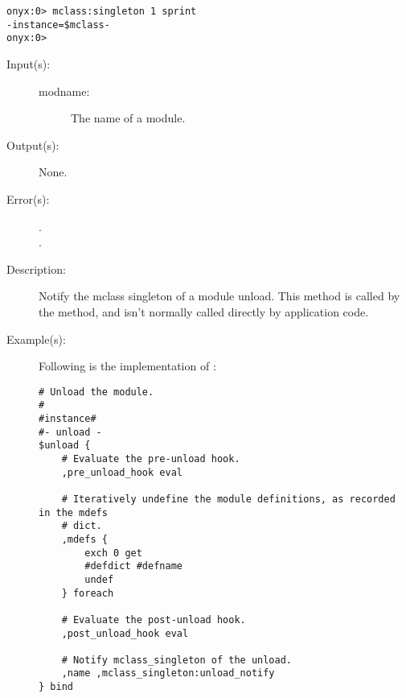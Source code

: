\begin{description}
\begin{description}
\begin{verbatim}
onyx:0> mclass:singleton 1 sprint
-instance=$mclass-
onyx:0> 
		\end{verbatim}
	\end{description}
\label{mclass:unload_notify}
\item[{\onyxop{modname}{unload\_notify}{--}}: ]
	\begin{description}\item[]
	\item[Input(s): ]
		\begin{description}\item[]
		\item[modname: ]
			The name of a module.
		\end{description}
	\item[Output(s): ] None.
	\item[Error(s): ]
		\begin{description}\item[]
		\item[.]
		\item[.]
		\end{description}
	\item[Description: ]
		Notify the mclass singleton of a module unload.  This method is
		called by the 
		method, and isn't normally called directly by application code.
	\item[Example(s): ] Following is the implementation of
		:
		\begin{verbatim}
# Unload the module.
#
#instance#
#- unload -
$unload {
    # Evaluate the pre-unload hook.
    ,pre_unload_hook eval

    # Iteratively undefine the module definitions, as recorded in the mdefs
    # dict.
    ,mdefs {
        exch 0 get
        #defdict #defname
        undef
    } foreach

    # Evaluate the post-unload hook.
    ,post_unload_hook eval

    # Notify mclass_singleton of the unload.
    ,name ,mclass_singleton:unload_notify
} bind
    		\end{verbatim}
	\end{description}
\end{description}
